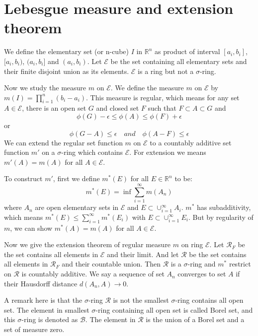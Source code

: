 \section{Lebesgue measure and extension theorem}
We define the elementary set (or n-cube) $I$ in $\mathbb{R}^n$ as product of interval $[a_i,b_i]$, $[a_i,b_i)$, $(a_i,b_i]$ and $(a_i,b_i)$. Let $\mathscr{E}$ be the set containing all elementary sets and their finite disjoint union as its elements. $\mathscr{E}$ is a ring but not a $\sigma$-ring. \par
Now we study the measure $m$ on $\mathscr{E}$. We define the measure $m$ on $\mathscr{E}$ by $m(I)=\prod_{i=1}^n (b_i-a_i)$. This measure is regular, which means for any set $A\in \mathscr{E}$, there is an open set $G$ and closed set $F$ such that $F\subset A\subset G$ and
\begin{equation*}
    \phi(G)-\epsilon\leq \phi(A)\leq \phi(F)+\epsilon
\end{equation*}
or 
\begin{equation*}
    \phi(G-A)\leq\epsilon\quad and \quad\phi(A-F)\leq\epsilon
\end{equation*}
We can extend the regular set function $m$ on $\mathscr{E}$ to a countably additive set function $m'$ on a $\sigma$-ring which contains $\mathscr{E}$. For extension we means $m'(A)=m(A)$ for all $A\in \mathscr{E}$.\par
To construct $m'$, first we define $m^*(E)$ for all $E\in \mathbb{R}^n$ to be:
\begin{equation*}
    m^*(E)=\inf\sum_{i=1}^\infty m(A_n)
\end{equation*}
where $A_n$ are open elementary sets in $\mathscr{E}$ and $E\subset \cup_{i=1}^\infty A_i$. $m^*$ has subadditivity, which means $m^*(E)\leq \sum_{i=1}^\infty m^*(E_i)$ with $E\subset \cup_{i=1}^\infty E_i$. But by regularity of $m$, we can show $m^*(A)=m(A)$ for all $A\in \mathscr{E}$.\par
Now we give the extension theorem of regular measure $m$ on ring $\mathscr{E}$. Let $\mathscr{R}_F$ be the set contains all elements in $\mathscr{E}$ and their limit. And let $\mathscr{R}$ be the set contains all elements in $\mathscr{R}_F$ and their countable union. Then $\mathscr{R}$ is a $\sigma$-ring and $m^*$ restrict on $\mathscr{R}$ is countably additive. We say a sequence of set $A_n$ converges to set $A$ if their Hausdorff distance $d(A_n,A)\to 0$.\par
A remark here is that the $\sigma$-ring $\mathscr{R}$ is not the smallest $\sigma$-ring contains all open set. The element in  smallest $\sigma$-ring containing all open set is called Borel set, and this $\sigma$-ring is denoted as $\mathscr{B}$. The element in $\mathscr{R}$ is the union of a Borel set and a set of measure zero.
